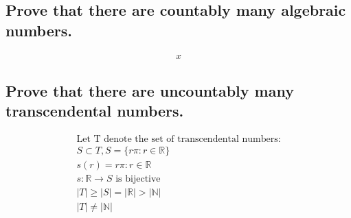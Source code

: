 \documentclass[letterpaper]{article}
\begin{document}
\subsection{Prove that there are countably many algebraic numbers.}
\begin{gather*}
x
\end{gather*}
\subsection{Prove that there are uncountably many transcendental numbers.}
\begin{gather*}
\text{Let T denote the set of transcendental numbers:} \\
S\subset T, S=\{r\pi:r\in\mathbb{R}\} \\
s(r)=r\pi:r\in\mathbb{R} \\
s:\mathbb{R}\rightarrow S \text{ is bijective} \\
|T|\geq|S|=|\mathbb{R}|>|\mathbb{N}| \\
\boxed{|T|\neq|\mathbb{N}|}
\end{gather*}
\end{document}
